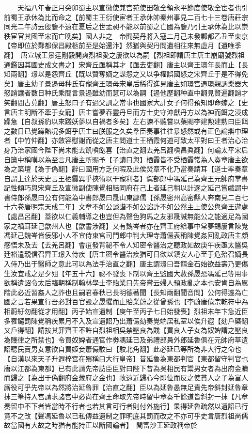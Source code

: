 　　天福八年春正月癸卯蜀主以宣徽使兼宫苑使田敬全領永平節度使敬全宦者也引前蜀王承休為比而命之【前蜀主王衍使宦者王承休帥秦州事見二百七十三卷唐莊宗同光二年詩云殷鑒不遠在夏后之世孟昶不能以前蜀之亡國為鑒乃引王承休為比以崇秩宦官其國至宋而亡晩矣】國人非之　帝聞契丹將入寇二月己未發鄴都乙丑至東京【帝即位於鄴都保昌殿柩前至是始還汴】然猶與契丹問遺相往來無虛月【遺唯季翻】　唐宣城王景逹剛毅開爽烈祖愛之屢欲以為嗣【烈祖即謂唐主唐主崩廟號烈祖通鑑因其國史成文書之】宋齊丘亟稱其才【亟去吏翻】唐主以齊王璟年長而止【長知兩翻】璟以是怨齊丘【既以贊奪嫡之謀怨之又以争權誤國怒之宋齊丘于是不得免矣】唐主幼子景逷母种氏有寵齊王璟母宋皇后稀得進見唐主如璟宫遇璟親調樂器大怒誚讓者數日种氏乘間言景逷雖幼而慧可以為嗣【逷他歷翻种直中翻見賢遍翻誚才笑翻間古莧翻】唐主怒曰子有過父訓之常事也國家大計女子何得預知即命嫁之【史言唐主明斷不牽于女寵】唐主嘗夢吞靈丹旦而方士史守沖獻丹方以為神而餌之浸成躁急【自叔孫豹以來踐妖夢以自禍者多矣】左右諫不聽嘗以藥賜李建勲建勲曰臣餌之數日已覺躁熱况多餌乎唐主曰朕服之久矣羣臣奏事往往暴怒然或有正色論辯中理者【中竹仲翻】亦斂容慰謝而從之唐主問道士王栖霞何道可致太平對曰王者治心治身乃治家國今陛下尚未能去飢嗔飽喜【治直之翻去羌呂翻嗔昌眞翻】何論太平宋后自簾中稱嘆以為至言凡唐主所賜予【子讀曰與】栖霞皆不受栖霞常為人奏章唐主欲為之築壇【為于偽翻】辭曰國用方乏何暇及此俟焚章不化乃當奏請耳【道士率奏章自謂上達於天史言王栖霞異乎挾術以干寵利者】駕部郎中馮延己為齊王元帥府掌書記性傾巧與宋齊丘及宣徽副使陳覺相結同府在己上者延己稍以計逐之延己嘗戲謂中書侍郎孫晟曰公有何能為中書郎晟曰晟山東鄙儒【孫晟密州高密縣人奔南見二百七十六卷唐明宗天成二年】文章不如公談諧不如公諂詐不如公然主上使公與齊王遊處【處昌呂翻】蓋欲以仁義輔導之也豈但為聲色狗馬之友邪晟誠無能公之能適足為國家之禍耳延己歙州人也【歙書涉翻】又有魏岑者亦在齊王府給事中常夢錫屢言陳覺馮延己魏岑皆佞邪小人不宜侍東宫司門郎中判大理寺蕭儼表稱陳覺姦回亂政唐主頗感悟未及去【去羌呂翻】會疽發背祕不令人知密令醫治之聽政如故庚午疾亟太醫吳廷裕遣親信召齊王璟入侍疾【唐主密令醫治疾猶可日欲以鎮安人心至于危殆召嫡長入侍乃出于醫師之意此可以為法手治直之翻】唐主謂璟曰吾餌金石始欲益壽乃更傷生汝宜戒之是夕殂【年五十六】祕不發喪下制以齊王監國大赦孫晟恐馮延己等用事欲稱遺詔令太后臨朝稱制翰林學士李貽業曰先帝嘗云婦人預政亂之本也安肯自為厲階此必近習姦人之詐也且嗣君春秋已長明德著聞【長知兩翻聞音問】公何得遽為亡國之言若果宣行吾必對百官毁之晟懼而止貽業蔚之從曾孫也【李蔚唐僖宗乾符中為相蔚紆勿翻從才用翻】丙子始宣遺制【庚午至丙子七日始發喪】烈祖末年卞急近臣多罹譴罰陳覺稱疾累月不入及宣遺詔乃出蕭儼劾奏覺端居私室以俟升遐【劾戶槩翻又戶得翻】請按其罪齊王不許自烈祖相吳禁壓良為賤【買良人子女為奴婢謂之壓良為賤律之所禁也】令買奴婢者通官作劵馮延已及弟禮部員外郎延魯俱在元帥府草遺詔聽民賣男女意欲自買姬妾蕭儼駮曰【駮北角翻】此必延已等所為非大行之命也【自漢以來天子升遐梓宫在殯稱曰大行皇帝】昔延魯為東都判官【東都留守判官也唐以江都為東都】已有此請先帝訪臣臣對曰陛下昔為吳相民有鬻男女者為出府金贖而歸之【為出于偽翻府金藏府之金也】故遠近歸心今即位而反之使貧人之子為富人厮役可乎先帝以為然將治延魯罪【治直之翻】臣以為延魯愚無足責先帝斜封延魯章抹三筆持入宫請求諸宫中必尚在齊王命取先帝時留中章奏千餘道皆斜封一抹【凡章奏留中不下者皆當時不行者也若其言可行者則付外施行】果得延魯疏然以遺詔已行竟不之改【聲馮延魯以已私傳益遺制之罪明底其罰而改之不亦可乎史言唐烈祖尚儒故當國有大故之時猶有能持正以斷國論者】　閩富沙王延政稱帝於